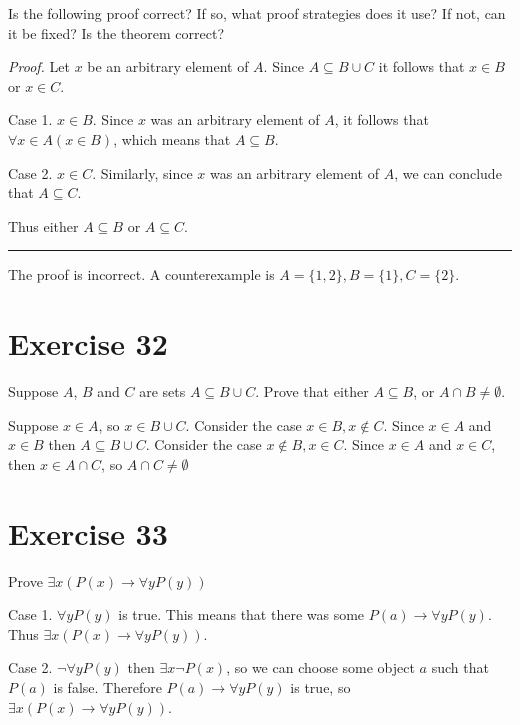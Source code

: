 \documentclass[11pt]{article}
\newcommand{\then}{\rightarrow}
\begin{document}
Is the following proof correct? If so, what proof strategies does it use? If not, 
can it be fixed? Is the theorem correct?

\textit{Proof.} Let $x$ be an arbitrary element of $A$. 
Since $A \subseteq B \cup C$ it follows that $x \in B$ or $x \in C$.

Case 1. $x \in B$. Since $x$ was an arbitrary element of $A$, it follows that 
$\forall x \in A(x \in B)$, which means that $A \subseteq B$.

Case 2. $x \in C$. Similarly, since $x$ was an arbitrary element of $A$, we can 
conclude that $A \subseteq C$.

Thus either $A \subseteq B$ or $A \subseteq C$.

\par\noindent\rule{\textwidth}{0.4pt}

The proof is incorrect. A counterexample is $A = \{1,2\}, B = \{1\}, C = \{2\}$.

\section*{Exercise 32}

Suppose $A$, $B$ and $C$ are sets $A \subseteq B \cup C$. Prove that either 
$A \subseteq B$, or $A \cap B \neq \emptyset$.

Suppose $x \in A$, so $x \in B \cup C$. Consider the case $x \in B, x \notin C$.
Since $x \in A$ and $x \in B$ then $A \subseteq B \cup C$. Consider the case 
$x \notin B, x \in C$. Since $x \in A$ and $x \in C$, then $x \in A \cap C$, 
so $A \cap C \neq \emptyset$

\section*{Exercise 33}

Prove $\exists x (P(x) \then \forall y P(y))$

Case 1. $\forall y P(y)$ is true. This means that there was some 
$P(a) \then \forall y P(y)$. Thus $\exists x (P(x) \then \forall y P(y))$.

Case 2. $\neg \forall y P(y)$ then $\exists x \neg P(x)$, so we can choose 
some object $a$ such that $P(a)$ is false. Therefore $P(a) \then \forall y P(y)$
is true, so $\exists x (P(x) \then \forall y P(y))$.
\end{document}
